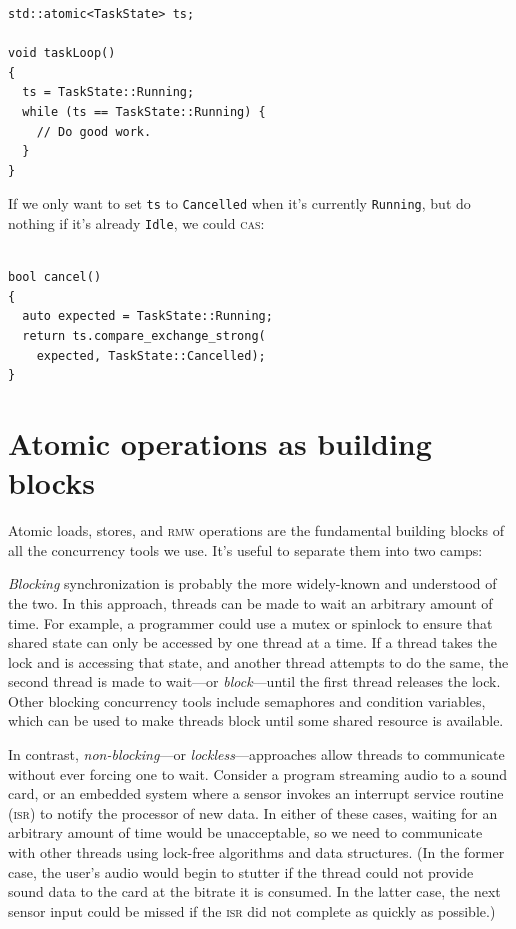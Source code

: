 \documentclass[fontsize=10pt, numbers=endperiod]{scrartcl}
\newcommand{\codesize}{\fontsize{10pt}{12pt}}
\newcommand{\introduce}[1]{\textit{#1}}
\newenvironment{colfigure}
  {\par\vspace{1\baselineskip minus 0.5\baselineskip}\noindent\minipage{\linewidth}}
  {\endminipage\vspace*{1\baselineskip minus 0.7\baselineskip}}
\begin{document}
\begin{multicols*}{2}
\begin{colfigure}
\begin{verbatim}
std::atomic<TaskState> ts;

void taskLoop()
{
  ts = TaskState::Running;
  while (ts == TaskState::Running) {
    // Do good work.
  }
}
\end{verbatim}
\end{colfigure}
If we only want to set \texttt{ts} to \texttt{Cancelled} when it's
currently \texttt{Running}, but do nothing if it's already \texttt{Idle},
we could \textsc{cas}:
\begin{colfigure}
\begin{verbatim}

bool cancel()
{
  auto expected = TaskState::Running;
  return ts.compare_exchange_strong(
    expected, TaskState::Cancelled);
}
\end{verbatim}
\end{colfigure}

\section{Atomic operations as building blocks}

Atomic loads, stores, and \textsc{rmw} operations are the fundamental building
blocks of all the concurrency tools we use.
It's useful to separate them into two camps:

\introduce{Blocking} synchronization is probably the more widely-known and
understood of the two.
In this approach,
threads can be made to wait an arbitrary amount of time.
For example, a programmer could use a mutex or spinlock to ensure that
shared state can only be accessed by one thread at a time.
If a thread takes the lock and is accessing that state,
and another thread attempts to do the same,
the second thread is made to wait---or \introduce{block}---until
the first thread releases the lock.
Other blocking concurrency tools include semaphores and condition variables,
which can be used to make threads block until some shared resource is available.

In contrast, \introduce{non-blocking}---or \introduce{lockless}---approaches
allow threads to communicate without ever forcing one to wait.
Consider a program streaming audio to a sound card, or
an embedded system where a sensor invokes an interrupt service routine
\textsc{(isr)} to notify the processor of new data.
In either of these cases, waiting for an arbitrary amount of time would be
unacceptable, so we need to communicate with other threads using lock-free
algorithms and data structures.
(In the former case, the user's audio would begin to stutter if the thread could not
provide sound data to the card at the bitrate it is consumed.
In the latter case, the next sensor input could be missed if the \textsc{isr}
did not complete as quickly as possible.)


\end{multicols*}
\end{document}
